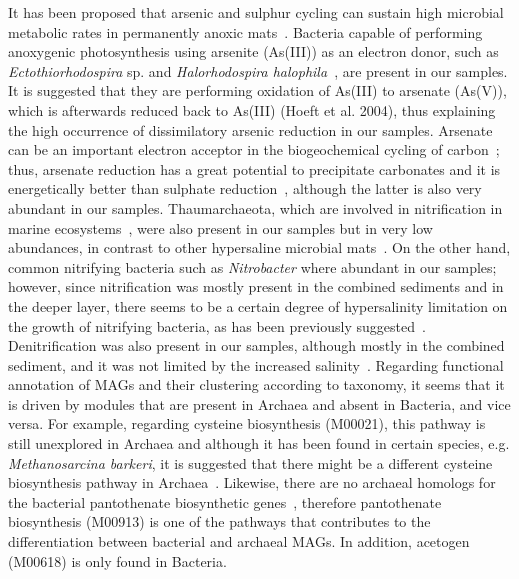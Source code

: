    It has been proposed that arsenic and sulphur cycling can sustain high microbial metabolic rates in permanently anoxic mats~\citep{visscher_modern_2020}. 
   Bacteria capable of performing anoxygenic photosynthesis using arsenite (As(III)) as an electron donor, 
   such as \textit{Ectothiorhodospira} sp. and \textit{Halorhodospira halophila}~\citep{hoeft_mccann_arsenite_2017}, are present in our samples. 
   It is suggested that they are performing oxidation of As(III) to arsenate (As(V)), which is afterwards reduced back to As(III) (Hoeft et al. 2004), 
   thus explaining the high occurrence of dissimilatory arsenic reduction in our samples. 
   Arsenate can be an important electron acceptor in the biogeochemical cycling of carbon~\citep{oremland_bacterial_2000}; 
   thus, arsenate reduction has a great potential to precipitate carbonates and it is energetically better than sulphate reduction~\citep{visscher_modern_2020}, 
   although the latter is also very abundant in our samples. 
   Thaumarchaeota, which are involved in nitrification in marine ecosystems~\citep{veuger_nitrification_2013}, 
   were also present in our samples but in very low abundances, in contrast to other hypersaline microbial mats~\citep{ruvindy_unravelling_2016}. 
   On the other hand, common nitrifying bacteria such as \textit{Nitrobacter} where abundant in our samples; 
   however, since nitrification was mostly present in the combined sediments and in the deeper layer, 
   there seems to be a certain degree of hypersalinity limitation on the growth of nitrifying bacteria, 
   as has been previously suggested~\citep{jeffries_increases_2012}. 
   Denitrification was also present in our samples, although mostly in the combined sediment, and it was not limited by 
   the increased salinity~\citep{laverman_potential_2007}. 
   Regarding functional annotation of MAGs and their clustering according to taxonomy, 
   it seems that it is driven by modules that are present in Archaea and absent in Bacteria, and vice versa. 
   For example, regarding cysteine biosynthesis (M00021), this pathway is still unexplored in Archaea 
   and although it has been found in certain species, e.g. \textit{Methanosarcina barkeri}, 
   it is suggested that there might be a different cysteine biosynthesis pathway in Archaea~\citep*{kitabatake_cysteine_2000}. 
   Likewise, there are no archaeal homologs for the bacterial pantothenate biosynthetic genes~\citep{ronconi_novel_2008}, 
   therefore pantothenate biosynthesis (M00913) is one of the pathways that contributes 
   to the differentiation between bacterial and archaeal MAGs. 
   In addition, acetogen (M00618) is only found in Bacteria.
   
